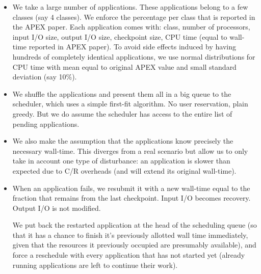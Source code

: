 \documentclass[conference]{IEEEtran}
\begin{document}
\begin{itemize}
  \item We take a large number of applications. These applications belong to a few classes
  (say 4 classes). We enforce the percentage per class that is reported in the APEX paper.
  Each application comes with: class, number of processors, input I/O size, output I/O size,
  checkpoint size,  CPU time (equal to wall-time reported in APEX paper). To avoid side effects
  induced by having hundreds
  of completely identical applications,
  we use normal distributions for CPU time with mean equal to original APEX value and small standard deviation (say 10\%).
  \item We shuffle the applications and present them all in a big queue to the scheduler,
  which uses a simple first-fit algorithm. No user reservation, plain greedy. But we do assume the scheduler has access to the entire list of pending applications.
\item We also make the assumption that the applications know precisely
  the necessary wall-time. This diverges from a real scenario but
  allow us to only take in account one type of disturbance: an
  application is slower than expected due to C/R overheads (and will
  extend its original wall-time).
  \item When an application fails, we resubmit it with a new wall-time equal to the fraction that remains from the last checkpoint.  Input I/O becomes recovery. Output I/O is not modified.

We put back the restarted application at the head of the scheduling queue
  (so that it has a chance to finish it's previously allotted wall time
  immediately, given that the resources it previously occupied are
  presumably available), and force a reschedule with every application that
  has not started yet (already running applications are left to continue
  their work).
\end{itemize}
\end{document}

